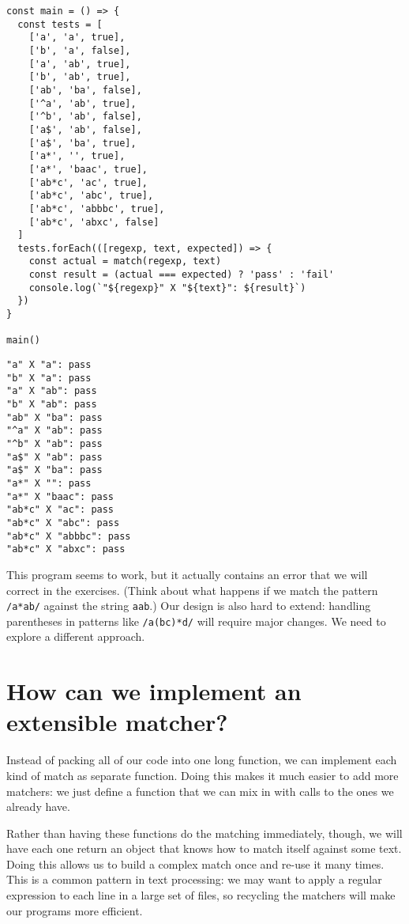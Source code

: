 \documentclass[krantzl]{krantz}
\begin{document}
\begin{lstlisting}[frame=single,frameround=tttt]
const main = () => {
  const tests = [
    ['a', 'a', true],
    ['b', 'a', false],
    ['a', 'ab', true],
    ['b', 'ab', true],
    ['ab', 'ba', false],
    ['^a', 'ab', true],
    ['^b', 'ab', false],
    ['a$', 'ab', false],
    ['a$', 'ba', true],
    ['a*', '', true],
    ['a*', 'baac', true],
    ['ab*c', 'ac', true],
    ['ab*c', 'abc', true],
    ['ab*c', 'abbbc', true],
    ['ab*c', 'abxc', false]
  ]
  tests.forEach(([regexp, text, expected]) => {
    const actual = match(regexp, text)
    const result = (actual === expected) ? 'pass' : 'fail'
    console.log(`"${regexp}" X "${text}": ${result}`)
  })
}

main()
\end{lstlisting}



\begin{lstlisting}[frame=single,frameround=tttt]
"a" X "a": pass
"b" X "a": pass
"a" X "ab": pass
"b" X "ab": pass
"ab" X "ba": pass
"^a" X "ab": pass
"^b" X "ab": pass
"a$" X "ab": pass
"a$" X "ba": pass
"a*" X "": pass
"a*" X "baac": pass
"ab*c" X "ac": pass
"ab*c" X "abc": pass
"ab*c" X "abbbc": pass
"ab*c" X "abxc": pass
\end{lstlisting}



This program seems to work,
but it actually contains an error that we will correct in the exercises.
(Think about what happens if we match the pattern \texttt{/a*ab/} against the string \texttt{{\textquotesingle}aab{\textquotesingle}}.)
Our design is also hard to extend:
handling parentheses in patterns like \texttt{/a(bc)*d/} will require major changes.
We need to explore a different approach.

\section{How can we implement an extensible matcher?}\label{pattern-matching-extensible}


Instead of packing all of our code into one long function,
we can implement each kind of match as separate function.
Doing this makes it much easier to add more matchers:
we just define a function that we can mix in with calls to the ones we already have.


Rather than having these functions do the matching immediately,
though,
we will have each one return an object that knows how to match itself against some text.
Doing this allows us to build a complex match once and re-use it many times.
This is a common pattern in text processing:
we may want to apply a regular expression to each line in a large set of files,
so recycling the matchers will make our programs more efficient.
\end{document}
